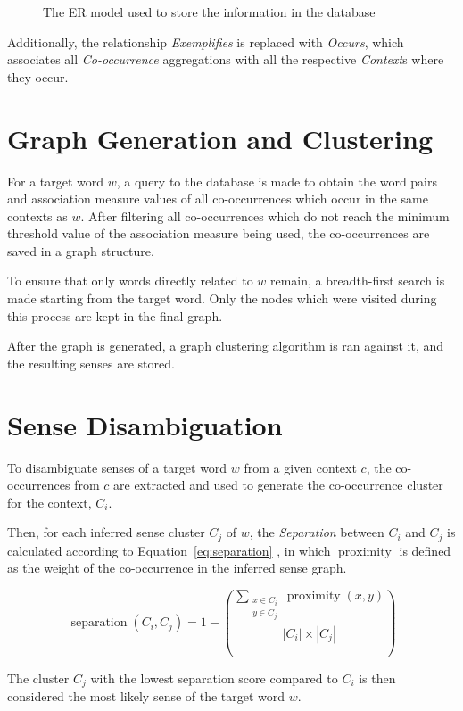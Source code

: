 \begin{figure}[ht]
    \caption{The \acl*{ER} model used to store the information in the database}
    \label{fig:er-model}
    \centering
    
\end{figure}

Additionally, the relationship \emph{Exemplifies} is replaced with
\emph{Occurs}, which associates all \emph{Co-occurrence} aggregations with all
the respective \emph{Context}s where they occur.

\section{Graph Generation and Clustering}

For a target word $w$, a query to the database is made to obtain the word pairs 
and association measure values of all co-occurrences which occur in the same 
contexts as $w$. After filtering all co-occurrences which do not reach the 
minimum threshold value of the association measure being used, the 
co-occurrences are saved in a graph structure.

To ensure that only words directly related to $w$ remain, a breadth-first 
search is made starting from the target word. Only the nodes which were visited 
during this process are kept in the final graph.

After the graph is generated, a graph clustering algorithm is ran against it,
and the resulting senses are stored.

\section{Sense Disambiguation}

To disambiguate senses of a target word $w$ from a given context
$c$, the co-occurrences from $c$ are extracted and used to generate
the co-occurrence cluster for the context, $C_i$.

Then, for each inferred sense cluster $C_j$ of $w$, the
\emph{Separation} between $C_i$ and $C_j$ is calculated according to
Equation~\ref{eq:separation} \citep{hope2013uos}, in which
$\operatorname{proximity}$ is defined as the weight of the co-occurrence in the
inferred sense graph.

\begin{equation}
 \operatorname{separation}(C_i,C_j) =
 1 - \left(
 \frac {\sum_{\substack{x \in C_i \\ y \in C_j}} \operatorname{proximity}(x,y)}
       {|C_i| \times |C_j|}
 \right)
\label{eq:separation}
\end{equation}

The cluster $C_j$ with the lowest separation score compared to $C_i$ is then
considered the most likely sense of the target word $w$.


